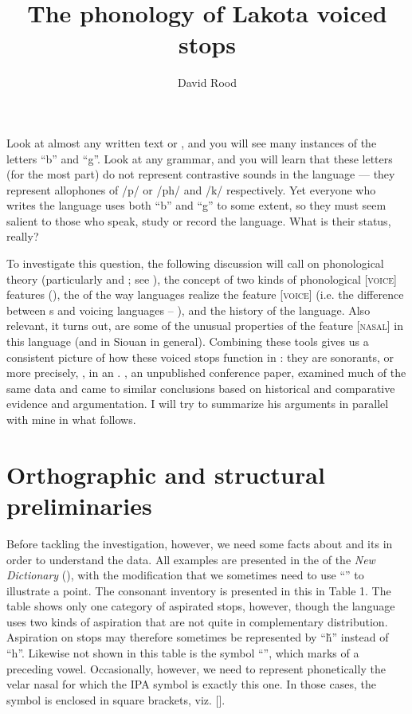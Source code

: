 \documentclass[output=paper]{LSP/langsci}
\author{David Rood}
\title{The phonology of {Lakota} voiced stops}
\begin{document}
Look at almost any written  text or , and you will see many instances of the letters ``b'' and ``g''. Look at any  grammar, and you will learn that these letters (for the most part) do not represent contrastive sounds in the language --- they represent allophones of /p/ or /ph/ and /k/ respectively. Yet everyone who writes the language uses both ``b'' and ``g'' to some extent, so they must seem salient to those who speak, study or record the language. What is their status, really?
 
To investigate this question, the following discussion will call on phonological theory (particularly  and ; see \citealt{Clements1985}), the concept of two kinds of phonological [\textsc{voice}] features (\citealt{Rice1993}), the  of the way languages realize the feature [\textsc{voice}] (i.e. the difference between s and voicing languages -- \citealt{RingenEtAl2013}), and the history of the language. Also relevant, it turns out, are some of the unusual properties of the feature [\textsc{nasal}] in this language (and in Siouan in general). Combining these tools gives us a consistent picture of how these voiced stops function in : they are sonorants, or more precisely, , in an . \citet{Rankin2001}, an unpublished conference paper, examined much of the same data and came to similar conclusions based on historical and comparative evidence and argumentation. I will try to summarize his arguments in parallel with mine in what follows. 

\section{Orthographic and structural preliminaries}

Before tackling the investigation, however, we need some facts about  and its  in order to understand the data. All examples are presented in the  of the \textit{New  Dictionary} (\citealt{Ullrich2012}), with the modification that we sometimes need to use ``'' to illustrate a point. The  consonant inventory is presented in this  in Table 1. The table shows only one category of aspirated stops, however, though the language uses two kinds of aspiration that are not quite in complementary distribution. Aspiration on stops may therefore sometimes be represented by ``\v{h}'' instead of ``h''. Likewise not shown in this table is the symbol ``'', which marks  of a preceding vowel. Occasionally, however, we need to represent phonetically the velar nasal for which the IPA symbol is exactly this one. In those cases, the symbol is enclosed in square brackets, viz. [].
\end{document}

